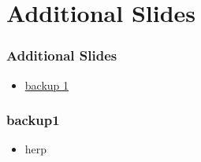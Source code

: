 \documentclass{beamer}
\begin{document}
	\appendix
	\section{Additional Slides}
	\setcounter{showProgressBar}{0}
	\setcounter{showSlideNumbers}{0}
	\setcounter{showBackButton}{0}

		\begin{frame}
			\frametitle{Additional Slides}
			\begin{itemize}
				\item \hyperlink{backup1}{backup 1}
			\end{itemize}
		\end{frame}

		\begin{frame}[label=backup1]
			\frametitle{backup1}
			\begin{itemize}
				\item herp
			\end{itemize}
		\end{frame}
\end{document}
